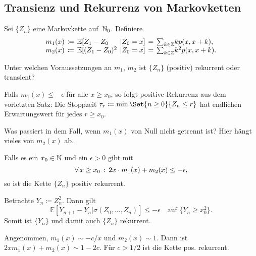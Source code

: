 \documentclass{cheat-sheet}
\newcommand{\E}{\mathbb{E}} %
\begin{document}

\subsection{Transienz und Rekurrenz von Markovketten}

\begin{setting}
  Sei $\{ Z_n \}$ eine Markovkette auf~$\mathbb{N}_0$.
  Definiere
  \[
    \arraycolsep=2pt
    \begin{array}{l l l l l l}
      m_1(x) &\coloneqq& \E[ Z_1 - Z_0 &| Z_0 = x ] &=& {\sum}_{k \in \Z} k p(x, x + k), \\
      m_2(x) &\coloneqq& \E[ (Z_1 - Z_0)^2 &| Z_0 = x ] &=& {\sum}_{k \in \Z} k^2 p(x, x + k).
    \end{array}
  \]
\end{setting}

\begin{frage}
  Unter welchen Voraussetzungen an $m_1$, $m_2$ ist $\{ Z_n \}$ (positiv) rekurrent oder transient?
\end{frage}

\begin{bem}
  Falls $m_1(x) \leq - \epsilon$ für alle $x \geq x_0$, so folgt positive Rekurrenz aus dem vorletzten Satz:
  Die Stoppzeit $\tau_r \coloneqq \min \Set{n \geq 0}{Z_n \leq r}$ hat endlichen Erwartungswert für jedes $r \geq x_0$.
\end{bem}

\begin{frage}
  Was passiert in dem Fall, wenn $m_1(x)$ von Null nicht getrennt ist? Hier hängt vieles von $m_2(x)$ ab.
\end{frage}

\begin{satz}
  Falls es ein $x_0 \in \mathbb{N}$ und ein $\epsilon > 0$ gibt mit
  \[
    \forall \, {x \geq x_0} \,:\, 2x \cdot m_1(x) + m_2(x) \leq - \epsilon,
  \]
  so ist die Kette $\{ Z_n \}$ positiv rekurrent.
\end{satz}

\begin{beweisidee}
  Betrachte $Y_n \coloneqq Z_n^2$.
  Dann gilt
  \[
    \E[ Y_{n+1} - Y_n | \sigma(Z_0, \ldots, Z_n) ] \leq - \epsilon
    \quad
    \text{auf } \{ Y_n \geq x_0^2 \}.
  \]
  Somit ist $\{ Y_n \}$ und damit auch $\{ Z_n \}$ rekurrent.
\end{beweisidee}

\begin{bsp}
  Angenommen, $m_1(x) \sim - c / x$ und $m_2(x) \sim 1$.
  Dann ist $2 x m_1(x) + m_2(x) \sim 1 - 2 c$.
  Für $c > 1/2$ ist die Kette pos. rekurrent.
\end{bsp}
\end{document}
